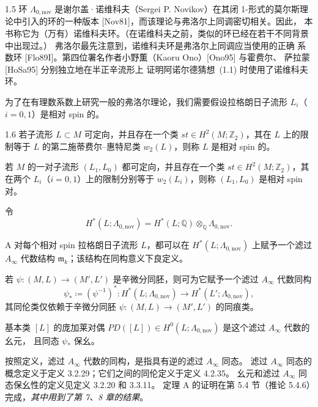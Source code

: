 \begin{remark}{1.5}\label{rem:1-5}
环 $\Lambda_{0,\mathrm{nov}}$ 是谢尔盖·诺维科夫（Sergei P. Novikov）在其闭
1-形式的莫尔斯理论中引入的环的一种版本 [Nov81]，而该理论与弗洛尔上同调密切相关。因此，
本书称它为（万有）诺维科夫环。（在诺维科夫之前，类似的环已经在若干不同背景中出现过。）
弗洛尔最先注意到，诺维科夫环是弗洛尔上同调应当使用的正确
系数环 [Flo89I]。第四位署名作者小野薫（Kaoru Ono）[Ono95] 与霍费尔、
萨拉蒙 [HoSa95] 分别独立地在半正辛流形上
证明阿诺尔德猜想~(1.1) 时使用了诺维科夫环。
\end{remark}

为了在有理数系数上研究一般的弗洛尔理论，我们需要假设拉格朗日子流形
$L_i$（$i=0,1$）是相对 spin 的。

\begin{definition}{1.6}\label{def:1-6}
若子流形 $L\subset M$ 可定向，并且存在一个类
$st\in H^2(M;\mathbb Z_2)$，其在 $L$ 上的限制等于 $L$ 的第二施蒂费尔--惠特尼类
$w_2(L)$，则称 $L$ 是相对 spin 的。

若 $M$ 的一对子流形 $(L_1,L_0)$ 都可定向，并且存在一个类
$st\in H^2(M;\mathbb Z_2)$，其在两个 $L_i$（$i=0,1$）上的限制分别等于
$w_2(L_i)$，则称 $(L_1,L_0)$ 是相对 spin 对。
\end{definition}

令
\[
  H^*(L;\Lambda_{0,\mathrm{nov}})
  =H^*(L;\mathbb Q)\otimes_{\mathbb Q}\Lambda_{0,\mathrm{nov}}.
\]

\begin{theorem}{A}\label{thm:A}
对每个相对 spin 拉格朗日子流形 $L$，都可以在
$H^*(L;\Lambda_{0,\mathrm{nov}})$ 上赋予一个滤过 $A_\infty$ 代数结构
$\mathfrak m_k$；该结构在同构意义下良定义。

若 $\psi\colon(M,L)\to(M',L')$ 是辛微分同胚，则可为它赋予一个滤过
$A_\infty$ 代数同构
\[
  \psi_*\coloneqq(\psi^{-1})^*\colon
  H^*(L;\Lambda_{0,\mathrm{nov}})
  \longrightarrow H^*(L';\Lambda_{0,\mathrm{nov}}),
\]
其同伦类仅依赖于辛微分同胚
$\psi\colon(M,L)\to(M',L')$ 的同痕类。

基本类 $[L]$ 的庞加莱对偶
$PD([L])\in H^0(L;\Lambda_{0,\mathrm{nov}})$ 是这个滤过 $A_\infty$ 代数的幺元，
且同态 $\psi_*$ 保幺。
\end{theorem}

按照定义，滤过 $A_\infty$ 代数的同构，是指具有逆的滤过 $A_\infty$ 同态。
滤过 $A_\infty$ 同态的概念定义于定义 3.2.29；它们之间的同伦定义于定义 4.2.35。
幺元和滤过 $A_\infty$ 同态保幺性的定义见定义 3.2.20 和 3.3.11。
定理 A 的证明在第 5.4 节（推论 5.4.6）完成，\emph{其中用到了第 7、8 章的结果}。

